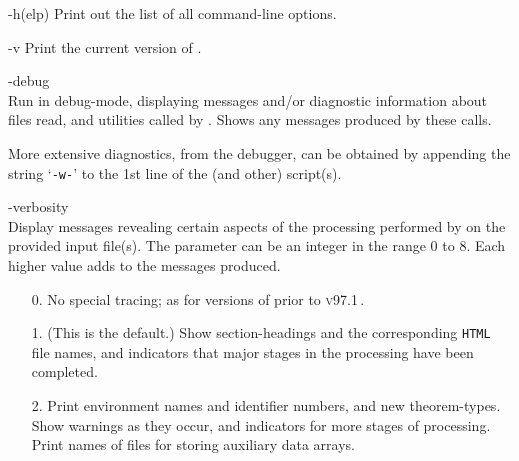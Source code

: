 \begin{htmllist}%
%
%
\item [ -h(elp)\label{optionlist}]
Print out the list of all command-line options.

%
\begin{changebar}
\item [ -v\label{showversion}] 
Print the current version of \latextohtml.
\end{changebar}%

%
\begin{changebar}
\item [ -debug\label{debugmode}]
\\
Run in debug-mode, displaying messages and/or diagnostic information 
about files read, and utilities called by \latextohtml.
Shows any messages produced by these calls.%

%

More extensive diagnostics, from the \Perl{} debugger, 
can be obtained by appending the string `\texttt{-w-}' 
to the 1st line of the  (and other) \Perl{} script(s).
\end{changebar}


%
\begin{changebar}
\item [ -verbosity \Meta{num}\label{verbositylevel}] 
\\
Display messages revealing certain aspects of the processing
performed by \latextohtml{} on the provided input file(s).
The  parameter can be an integer in the range 0 to 8.
Each higher value adds to the messages produced.

\begin{itemize}
\item[0. ]
No special tracing; as for versions of \latextohtml{} prior to \textsc{v97.1}\,.

\item[1. ] (This is the default.)
Show section-headings and the corresponding \texttt{HTML} file names,
and indicators that major stages in the processing have been completed.

\item[2. ]
Print environment names and identifier numbers, and new theorem-types.
Show warnings as they occur, and indicators for more stages of processing.
Print names of files for storing auxiliary data arrays.


\end{itemize}
\end{changebar}
\end{htmllist}
